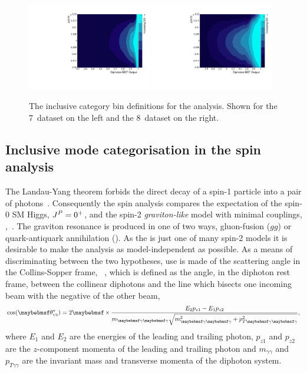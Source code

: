 \begin{figure}
  \includegraphics[width=0.48\textwidth]{selec_and_cats/plots/sideband_cats_7TeV_fix.pdf}
  \includegraphics[width=0.48\textwidth]{selec_and_cats/plots/sideband_cats_8TeV_fix.pdf}
  \caption[The inclusive category bin definitions for the \acs{SMVA} analysis]{The inclusive category bin definitions for the \SMVA analysis. Shown for the 7~\TeV dataset on the left and the 8~\TeV dataset on the right.}
  \label{fig:sideband_cats}
\end{figure}

\subsection{Inclusive mode categorisation in the spin analysis}
\label{sec:spin_cats}

The Landau-Yang theorem forbids the direct decay of a spin-1 particle into a pair of photons~\cite{Landau1948,Yang1950}. 
Consequently the spin analysis compares the expectation of the spin-0 SM Higgs, $J^{P}=0^{+}$, and the spin-2 \emph{graviton-like} 
model with minimal couplings, \twomp,~\cite{Gao2010}. The \twomp graviton resonance is produced in one of two ways, gluon-fusion ($gg$) 
or quark-antiquark annihilation (\qqbar). As the \twomp is just one of many spin-2 models it is desirable to make the analysis as model-independent as possible. As a means of 
discriminating between the two hypotheses, use is made of the scattering angle in the Collins-Sopper frame, \costhetastar ~\cite{CollinsSoper1977}, which is defined as the angle, in the diphoton rest frame, between the collinear diphotons 
and the line which bisects one incoming beam with the negative of the other beam, 
\begin{equation}
  \cos(\theta^{\ast}_{\mbox{\tiny{CS}}}) = 2\times\frac{E_{2}p_{z1}-E_{1}p_{z2}}{m_{\gamma\gamma}\sqrt{m^{2}_{\gamma\gamma}+p^{2}_{T\gamma\gamma}}},
  \label{eq:costheta}
\end{equation}
where $E_{1}$ and $E_{2}$ are the energies of the leading and trailing photon, $p_{z1}$ and $p_{z2}$ are the $z$-component momenta 
of the leading and trailing photon and $m_{\gamma\gamma}$ and $p_{T\gamma\gamma}$ are the invariant mass and transverse momenta of the diphoton system.

